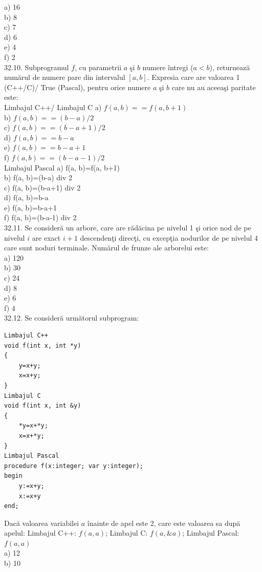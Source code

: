\begin{itemize}
\begin{enumerate}
a) 16
\\
b) 8
\\
c) 7
\\
d) 6
\\
e) 4
\\
f) 2
\\
32.10. Subprogramul $f$, cu parametrii $a$ şi $b$ numere întregi ($a<b$), returnează numărul de numere pare din intervalul $[a,b]$. Expresia care are valoarea 1 (C++/C)/ True (Pascal), pentru orice numere $a$ şi $b$ care nu au aceeaşi paritate este:
\\
Limbajul C++/ Limbajul C
a) $f(a, b)==f(a, b+1)$
\\
b) $f(a, b)==(b-a) / 2$
\\
c) $f(a, b)==(b-a+1) / 2$
\\
d) $f(a, b)==b-a$
\\
e) $f(a, b)==b-a+1$
\\
f) $f(a, b)==(b-a-1) / 2$
\\
Limbajul Pascal
a) f(a, b)=f(a, b+1)
\\
b) f(a, b)=(b-a) div 2
\\
c) f(a, b)=(b-a+1) div 2
\\
d) f(a, b)=b-a
\\
e) f(a, b)=b-a+1
\\
f) f(a, b)=(b-a-1) div 2
\\
32.11. Se consideră un arbore, care are rădăcina pe nivelul 1 şi orice nod de pe nivelul $i$ are exact $i+1$ descendenţi direcţi, cu excepţia nodurilor de pe nivelul 4 care sunt noduri terminale. Numărul de frunze ale arborelui este:
\\
a) 120
\\
b) 30
\\
c) 24
\\
d) 8
\\
e) 6
\\
f) 4
\\
32.12. Se consideră următorul subprogram:
\begin{verbatim}
Limbajul C++
void f(int x, int *y)
{
    y=x+y;
    x=x+y;
}
Limbajul C
void f(int x, int &y)
{
    *y=x+*y;
    x=x+*y;
}
Limbajul Pascal
procedure f(x:integer; var y:integer);
begin
    y:=x+y;
    x:=x+y
end;
\end{verbatim}
Dacă valoarea variabilei $a$ înainte de apel este 2, care este valoarea sa după apelul:
Limbajul C++: $f(a, a)$; Limbajul C: $f(a, \&a)$; Limbajul Pascal: $f(a, a)$
\\
a) 12
\\
b) 10

\end{enumerate}
\end{itemize}

